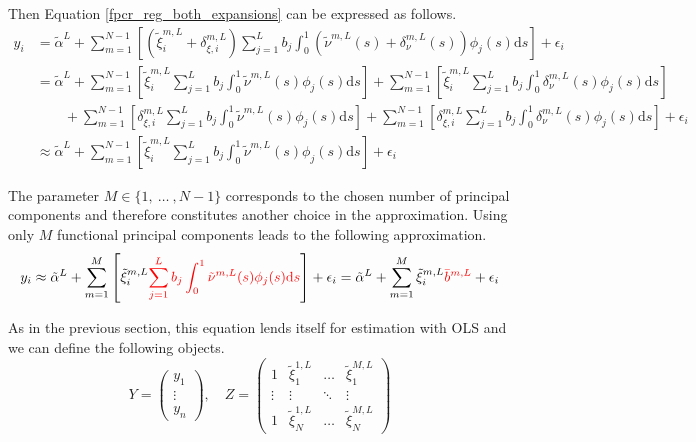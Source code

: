 \documentclass[11pt,twoside,a4paper]{article}
\begin{document}
	Then Equation \ref{fpcr_reg_both_expansions} can be expressed as follows.
	\begin{equation}
		\begin{split}
			y_i & = \tilde{\alpha}^L
			+ \sum_{m = 1}^{N-1} \left[ \left(\tilde{\xi}^{m,L}_{i} + \delta_{\xi, i}^{m, L} \right) \sum_{j = 1}^{L} b_j \int_{0}^{1} \left(\tilde{\nu}^{m,L}(s) + \delta_{\nu}^{m,L}(s) \right) \phi_j(s) \mathrm{d}s \right] 
			+ \epsilon_i \\
			& = \tilde{\alpha}^L
			+ \sum_{m = 1}^{N-1} \left[ \tilde{\xi}^{m,L}_{i} \sum_{j = 1}^{L} b_j \int_{0}^{1} \tilde{\nu}^{m,L}(s) \phi_j(s) \mathrm{d}s \right] 
			+ \sum_{m = 1}^{N-1} \left[ \tilde{\xi}^{m,L}_{i} \sum_{j = 1}^{L} b_j \int_{0}^{1} \delta_{\nu}^{m,L}(s) \phi_j(s) \mathrm{d}s \right] \\
			& \quad \quad + \sum_{m = 1}^{N-1} \left[ \delta_{\xi, i}^{m, L} \sum_{j = 1}^{L} b_j \int_{0}^{1} \tilde{\nu}^{m,L}(s) \phi_j(s) \mathrm{d}s \right] 
			+ \sum_{m = 1}^{N-1} \left[ \delta_{\xi, i}^{m, L} \sum_{j = 1}^{L} b_j \int_{0}^{1} \delta_{\nu}^{m,L}(s) \phi_j(s) \mathrm{d}s \right]
			+ \epsilon_i \\
			& \approx \tilde{\alpha}^L
			+ \sum_{m = 1}^{N-1} \left[ \tilde{\xi}^{m,L}_{i} \sum_{j = 1}^{L} b_j \int_{0}^{1} \tilde{\nu}^{m,L}(s) \phi_j(s) \mathrm{d}s \right] + \epsilon_i
		\end{split}
	\end{equation}

	The parameter $M \in \{1,\: \dots \:, N-1\}$ corresponds to the chosen number of principal components and therefore constitutes another choice in the approximation. Using only $M$ functional principal components leads to the following approximation.
	\begin{equation}
		y_i \approx \tilde{\alpha}^L
		+ \sum_{m = 1}^{M} \left[ \tilde{\xi}^{m,L}_{i} {\color{red}\sum_{j = 1}^{L} b_j \int_{0}^{1} \tilde{\nu}^{m,L}(s) \phi_j(s) \mathrm{d}s} \right] + \epsilon_i 
		= \tilde{\alpha}^L
		+ \sum_{m = 1}^{M} \tilde{\xi}^{m,L}_{i} {\color{red}\bar{b}^{m,L}} + \epsilon_i
	\end{equation}
	
	As in the previous section, this equation lends itself for estimation with OLS and we can define the following objects.
	\begin{equation}
		Y = \begin{pmatrix}
			y_1 \\ \vdots \\ y_n
		\end{pmatrix}, \quad
		Z = \begin{pmatrix}
			1 & \tilde{\xi}^{1,L}_{1} & \dots & \tilde{\xi}^{M,L}_{1} \\
			\vdots & \vdots & \ddots & \vdots \\
			1 & \tilde{\xi}^{1,L}_{N} & \dots & \tilde{\xi}^{M,L}_{N}
		\end{pmatrix}
	\end{equation}
	
\end{document}
